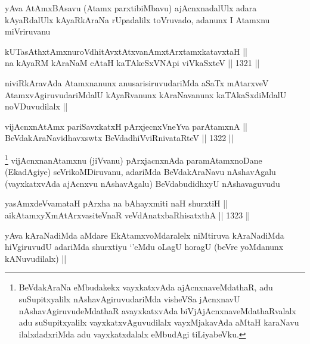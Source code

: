\begin{artha}
yAva AtAmxBAsavu (Atamx parxtibiMbavu) ajAcnxnadalUlx adara kAyaRdalUlx kAyaRkAraNa rUpadalilx toVruvado, adanunx I Atamxnu miVriruvanu
\end{artha}

\begin{shl}
kUTasAthxtAmxnuroVdhitAvxtAtxvanAmxtArxtamxkatavxtaH || \\
na kAyaRM kAraNaM cAtaH kaTAkeSxVNApi viVkaSxteV ||  1321 ||  
\end{shl}

\begin{artha}
niviRkAravAda Atamxnanunx anusarisiruvudariMda aSaTx mAtarxveV AtamxvAgiruvudariMdalU kAyaRvanunx kAraNavanunx kaTAkaSxdiMdalU noVDuvudilalx ||
\end{artha}



\begin{shl}
vijAcnxnAtAmx pariSavxkatxH pArxjecnxVneYva parAtamxnA || \\
BeVdakAraNavidhavxswtx BeVdadhiVviRnivataRteV ||  1322 ||  
\end{shl}

\begin{artha}
\footnote{BeVdakAraNa eMbudakekx vayxkatxvAda ajAcnxnaveMdathaR, adu suSupitxyalilx nAshavAgiruvudariMda visheVSa jAcnxnavU nAshavAgiruvudeMdathaR avayxkatxvAda biVjAjAcnxnaveMdathaRvalalx adu suSupitxyalilx vayxkatxvAguvudilalx vayxMjakavAda aMtaH karaNavu ilalxdadxriMda adu vayxkatxdalalx eMbudAgi tiLiyabeVku.}
vijAcnxnanAtamxnu (jiVvanu) pArxjacnxnAda paramAtamxnoDane (EkadAgiye) seVrikoMDiruvanu, adariMda BeVdakAraNavu nAshavAgalu (vayxkatxvAda ajAcnxvu nAshavAgalu) BeVdabudidhxyU nAshavaguvudu 
\end{artha}

\begin{shl}
yasAmxdeVvamataH pArxha na bAhayxmiti naH shurxtiH || \\
aikAtamxyXmAtArxvasiteVnaR veVdAnatxbaRhisatxthA ||  1323 ||  
\end{shl}

\begin{artha}
yAva kAraNadiMda aMdare EkAtamxvoMdaralelx niMtiruva kAraNadiMda hiVgiruvudU adariMda shurxtiyu `\stext'eMdu oLagU horagU (beVre yoMdanunx kANuvudilalx) ||
\end{artha}


